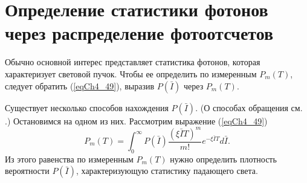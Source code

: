 \section{Определение статистики фотонов через распределение
  фотоотсчетов}
Обычно основной интерес представляет статистика фотонов, которая
характеризует световой пучок. Чтобы ее определить по измеренным
$P_m\left(T\right)$, следует обратить (\ref{eqCh4_49}), выразив
$P\left(\bar{I}\right)$ через $P_m\left(T\right)$. 
   
Существует несколько способов нахождения $P\left(\bar{I}\right)$.  (О
способах обращения см. \cite{bDvait1973}.) Остановимся на одном
из них.  Рассмотрим выражение (\ref{eqCh4_49})
\[
P_m\left(T\right) = 
\int_0^{\infty}
P\left(\bar{I}\right)
\frac{\left(\xi \bar{I}T\right)^m}{m!} e^{-
  \xi \bar{I} T} 
d \bar{I}.
\]
Из этого равенства по измеренным $P_m\left(T\right)$ нужно определить
плотность вероятности  $P\left(\bar{I}\right)$,  характеризующую
статистику падающего света.   

